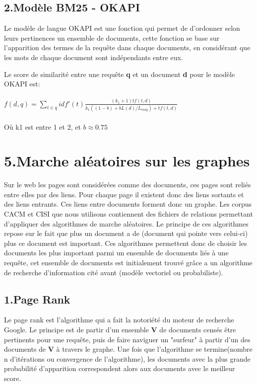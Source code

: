 \documentclass[a4paper,11pt]{report}
\begin{document}
\subsection*{2.Modèle BM25 - OKAPI}

Le modèle de langue OKAPI est une fonction qui permet de d'ordonner selon leurs pertinences un ensemble de documents, cette fonction se base sur l'apparition des termes de la requête dans chaque documents, en considérant que les mots de chaque document sont indépendants entre eux.

Le score de similarité entre une requête \textbf{q} et un document \textbf{d} pour le modèle OKAPI est:\\\\
$f(d,q)=\sum_{t\in q}idf'(t)\frac{(k_1+1)tf(t,d)}{k_1((1-b)+bL(d)/L_{moy})+tf(t,d)}$\\\\
Où k1 est entre 1 et 2, et $b\approx0.75$



\section*{5.Marche aléatoires sur les graphes}
Sur le web les pages sont considérées comme des documents, ces pages sont reliés entre elles par des liens. Pour chaque page il existent donc des liens sortants et des liens entrants. Ces liens entre documents forment donc un graphe. Les corpus CACM et CISI que nous utilisons contiennent des fichiers de relations permettant d'appliquer des algorithmes de marche aléatoires. Le principe de ces algorithmes repose sur le fait que plus un document a de (document qui pointe vers celui-ci) plus ce document est important. Ces algorithmes permettent donc de choisir les documents les plus important parmi un ensemble de documents liés à une requête, cet ensemble de documents est initialement trouvé grâce a un algorithme de recherche d'information cité avant (modèle vectoriel ou probabiliste).

\subsection*{1.Page Rank}
Le page rank est l'algorithme qui a fait la notoriété du moteur de recherche Google. Le principe est de partir d'un ensemble \textbf{V} de documents censés être pertinents pour une requête, puis de faire naviguer un "surfeur" à partir d'un des documents de \textbf{V} à travers le graphe. Une fois que l'algorithme se termine(nombre n d'itérations ou convergence de l'algorithme), les documents avec la plus grande probabilité d'apparition correspondent alors aux documents avec le meilleur score.
\end{document}
